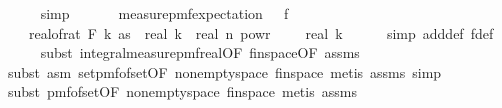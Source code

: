 \begin{isabellebody}
\ \ \ \ \isamarkupfalse%
\ simp\isanewline
\ \ \isamarkupfalse%
\ \isamarkupfalse%
\ {\isachardoublequoteopen}\ measure{\isacharunderscore}{\kern0pt}pmf{\isachardot}{\kern0pt}expectation\ {\isasymOmega}\ {\isacharparenleft}{\kern0pt}{\isasymlambda}{\isasymomega}{\isachardot}{\kern0pt}\ f\ {\isasymomega}{\isacharcircum}{\kern0pt}{}{\isacharparenright}{\kern0pt}\ {\isasymle}\ {\isacharparenleft}{\kern0pt}\isanewline
\ \ \ \ real{\isacharunderscore}{\kern0pt}of{\isacharunderscore}{\kern0pt}rat\ {\isacharparenleft}{\kern0pt}F\ k\ as{\isacharparenright}{\kern0pt}{\isacharparenright}{\kern0pt}\ {\isacharasterisk}{\kern0pt}\ real\ k\ {\isacharasterisk}{\kern0pt}\ real\ n\ powr\ {\isacharparenleft}{\kern0pt}{}\ {\isacharminus}{\kern0pt}\ {}\ {\isacharslash}{\kern0pt}\ real\ k{\isacharparenright}{\kern0pt}{\isachardoublequoteclose}\isanewline
\ \ \ \ \isamarkupfalse%
\ {\isacharparenleft}{\kern0pt}simp\ add{\isacharcolon}{\kern0pt}{\isasymOmega}{\isacharunderscore}{\kern0pt}def\ f{\isacharunderscore}{\kern0pt}def{\isacharparenright}{\kern0pt}\isanewline
\ \ \ \ \isamarkupfalse%
\ {\isacharparenleft}{\kern0pt}subst\ integral{\isacharunderscore}{\kern0pt}measure{\isacharunderscore}{\kern0pt}pmf{\isacharunderscore}{\kern0pt}real{\isacharbrackleft}{\kern0pt}OF\ fin{\isacharunderscore}{\kern0pt}space{\isacharbrackleft}{\kern0pt}OF\ assms{\isacharparenleft}{\kern0pt}{}{\isacharparenright}{\kern0pt}{\isacharbrackright}{\kern0pt}{\isacharbrackright}{\kern0pt}{\isacharparenright}{\kern0pt}\isanewline
\ \ \ \ \ \isamarkupfalse%
\ {\isacharparenleft}{\kern0pt}subst\ {\isacharparenleft}{\kern0pt}asm{\isacharparenright}{\kern0pt}\ set{\isacharunderscore}{\kern0pt}pmf{\isacharunderscore}{\kern0pt}of{\isacharunderscore}{\kern0pt}set{\isacharbrackleft}{\kern0pt}OF\ non{\isacharunderscore}{\kern0pt}empty{\isacharunderscore}{\kern0pt}space\ fin{\isacharunderscore}{\kern0pt}space{\isacharbrackright}{\kern0pt}{\isacharcomma}{\kern0pt}\ metis\ assms{\isacharparenleft}{\kern0pt}{}{\isacharparenright}{\kern0pt}{\isacharcomma}{\kern0pt}\ simp{\isacharparenright}{\kern0pt}\isanewline
\ \ \ \ \isamarkupfalse%
\ {\isacharparenleft}{\kern0pt}subst\ pmf{\isacharunderscore}{\kern0pt}of{\isacharunderscore}{\kern0pt}set{\isacharbrackleft}{\kern0pt}OF\ non{\isacharunderscore}{\kern0pt}empty{\isacharunderscore}{\kern0pt}space\ fin{\isacharunderscore}{\kern0pt}space{\isacharbrackright}{\kern0pt}{\isacharcomma}{\kern0pt}\ metis\ assms{\isacharparenleft}{\kern0pt}{}{\isacharparenright}{\kern0pt}{\isacharparenright}{\kern0pt}\isanewline

\end{isabellebody}
